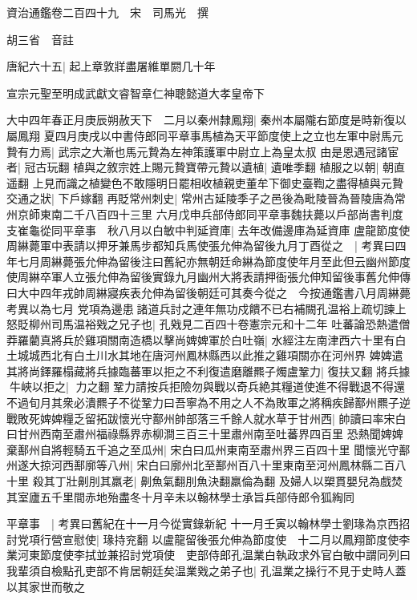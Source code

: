 資治通鑑卷二百四十九　宋　司馬光　撰

胡三省　音註

唐紀六十五|{
	起上章敦牂盡屠維單閼几十年}


宣宗元聖至明成武獻文睿智章仁神聰懿道大孝皇帝下

大中四年春正月庚辰朔赦天下　二月以秦州隸鳳翔|{
	秦州本屬隴右節度是時新復以屬鳳翔}
夏四月庚戌以中書侍郎同平章事馬植為天平節度使上之立也左軍中尉馬元贄有力焉|{
	武宗之大漸也馬元贄為左神策護軍中尉立上為皇太叔}
由是恩遇冠諸宦者|{
	冠古玩翻}
植與之敘宗姓上賜元贄寶帶元贄以遺植|{
	遺唯季翻}
植服之以朝|{
	朝直遥翻}
上見而識之植變色不敢隱明日罷相收植親吏董牟下御史臺鞫之盡得植與元贄交通之狀|{
	下戶嫁翻}
再貶常州刺史|{
	常州古延陵季子之邑後為毗陵晉為晉陵唐為常州京師東南二千八百四十三里}
六月戊申兵部侍郎同平章事魏扶薨以戶部尚書判度支崔龜從同平章事　秋八月以白敏中判延資庫|{
	去年改備邊庫為延資庫}
盧龍節度使周綝薨軍中表請以押牙兼馬步都知兵馬使張允伸為留後九月丁酉從之　|{
	考異曰四年七月周綝薨張允伸為留後注曰舊紀亦無朝廷命綝為節度使年月至此但云幽州節度使周綝卒軍人立張允伸為留後實錄九月幽州大將表請押衙張允伸知留後事舊允伸傳曰大中四年戎帥周綝寢疾表允伸為留後朝廷可其奏今從之　今按通鑑書八月周綝薨考異以為七月}
党項為邊患諸道兵討之連年無功戍饋不已右補闕孔温裕上疏切諫上怒貶柳州司馬温裕戣之兄子也|{
	孔戣見二百四十卷憲宗元和十二年}
吐蕃論恐熱遣僧莽羅藺真將兵於雞項關南造橋以擊尚婢婢軍於白吐嶺|{
	水經注左南津西六十里有白土城城西北有白土川水其地在唐河州鳳林縣西以此推之雞項關亦在河州界}
婢婢遣其將尚鐸羅榻藏將兵據臨蕃軍以拒之不利復遣磨離羆子燭盧鞏力|{
	復扶又翻}
將兵據牛峽以拒之|{
	力之翻}
鞏力請按兵拒險勿與戰以奇兵絶其糧道使進不得戰退不得還不過旬月其衆必潰羆子不從鞏力曰吾寧為不用之人不為敗軍之將稱疾歸鄯州羆子逆戰敗死婢婢糧乏留拓跋懷光守鄯州帥部落三千餘人就水草于甘州西|{
	帥讀曰率宋白曰甘州西南至肅州福祿縣界赤柳澗三百三十里肅州南至吐蕃界四百里}
恐熱聞婢婢棄鄯州自將輕騎五千追之至瓜州|{
	宋白曰瓜州東南至肅州界三百四十里}
聞懷光守鄯州遂大掠河西鄯廓等八州|{
	宋白曰廓州北至鄯州百八十里東南至河州鳳林縣二百八十里}
殺其丁壯劓刖其羸老|{
	劓魚氣翻刖魚決翻羸倫為翻}
及婦人以槊貫嬰兒為戲焚其室廬五千里間赤地殆盡冬十月辛未以翰林學士承旨兵部侍郎令狐綯同

平章事　|{
	考異曰舊紀在十一月今從實錄新紀}
十一月壬寅以翰林學士劉瑑為京西招討党項行營宣慰使|{
	瑑持兖翻}
以盧龍留後張允伸為節度使　十二月以鳳翔節度使李業河東節度使李拭並兼招討党項使　吏部侍郎孔温業白執政求外官白敏中謂同列曰我輩須自檢點孔吏部不肯居朝廷矣温業戣之弟子也|{
	孔温業之操行不見于史時人蓋以其家世而敬之}


